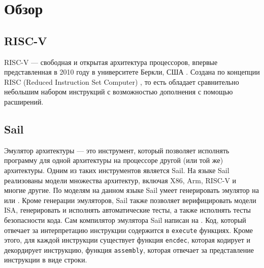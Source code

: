 
\section{Обзор}
\label{sec:relatedworks}

\subsection{RISC-V}
RISC-V --- свободная и открытая архитектура процессоров, впервые представленная в 2010 году в университете Беркли, США \cite{waterman2016design}. Создана по концепции RISC (Reduced Instruction Set Computer) \cite{jamil1995risc}, то есть обладает сравнительно небольшим набором инструкций с возможностью дополнения с помощью расширений.

\subsection{Sail}
Эмулятор архитектуры --- это инструмент, который позволяет исполнять программу для одной архитектуры на процессоре другой (или той же) архитектуры. Одним из таких инструментов является Sail. На языке Sail реализованы модели множества архитектур, включая X86, Arm, RISC-V и многие другие. По моделям на данном языке Sail умеет генерировать эмулятор на \OCaml{} или \C{}. Кроме генерации эмуляторов, Sail также позволяет верифицировать модели ISA, генерировать и исполнять автоматические тесты, а также исполнять тесты безопасности кода. Сам компилятор эмулятора Sail написан на \OCaml{}. Код, который отвечает за интерпретацию инструкции содержится в \texttt{execute} функциях. Кроме этого, для каждой инструкции существует функция \texttt{encdec}, которая кодирует и декордирует инструкцию, функция \texttt{assembly}, которая отвечает за представление инструкции в виде строки.

